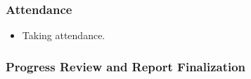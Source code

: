 \documentclass[11pt]{article}
\begin{document}
\hypertarget{attendance-6}{%
\subsubsection{Attendance}\label{attendance-6}}

\begin{itemize}
\tightlist
\item
  Taking attendance.
\end{itemize}

\hypertarget{progress-review-and-report-finalization}{%
\subsubsection{Progress Review and Report
Finalization}\label{progress-review-and-report-finalization}}
\end{document}
